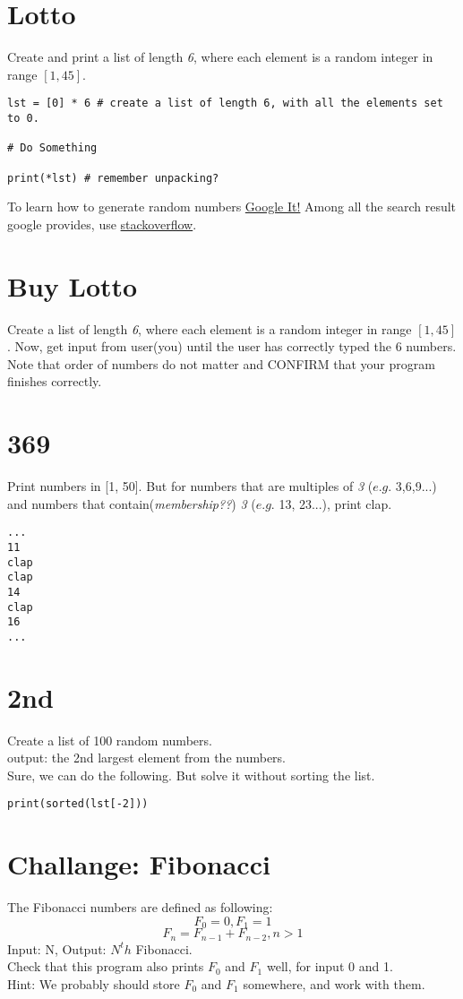 \documentclass{article}
\begin{document}
\section{Lotto}
Create and print a list of length \textit{6}, where each element is a random
integer in range $[1, 45]$.

\begin{lstlisting}
lst = [0] * 6 # create a list of length 6, with all the elements set to 0.

# Do Something

print(*lst) # remember unpacking?
\end{lstlisting}
To learn how to generate random numbers
\href{https://www.google.com/search?q=python+random+number}{Google It!}
Among all the search result google provides, use \href{https://stackoverflow.com}{stackoverflow}.


\section{Buy Lotto}
Create a list of length \textit{6}, where each element is a random integer in
range $[1, 45]$.  Now, get input from user(you) until the user has correctly typed the 6
numbers.\\
Note that order of numbers do not matter and CONFIRM that your program finishes correctly.


\section{369}
Print numbers in [1, 50]. But for numbers that are multiples of \textit{3}  ($e.g.$
3,6,9...) and numbers that contain(\textit{membership??}) \textit{3}  ($e.g.$ 13, 23...), print clap.
\begin{lstlisting}
...
11
clap
clap
14
clap
16
...
\end{lstlisting}

\section{2nd}
Create a list of 100 random numbers.\\
output: the 2nd largest element from the numbers.\\
Sure, we can do the following. But solve it without sorting the list.
\begin{lstlisting}
print(sorted(lst[-2]))
\end{lstlisting}

\pagebreak
\section{Challange: Fibonacci}
The Fibonacci numbers are defined as following:
$$F_0 = 0, F_1 = 1$$
$$F_n = F_{n-1}+F_{n-2}, n > 1$$
Input: N, Output: $N^th$ Fibonacci.\\
Check that this program also prints $F_0$ and $F_1$ well, for input 0 and 1.\\
Hint: We probably should store $F_0$ and $F_1$ somewhere, and work with them.
\end{document}
